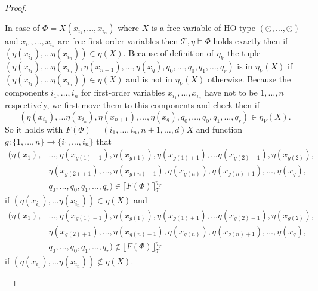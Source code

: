 \begin{proof}
\begin{compactitem}
        \item In case of $\Phi = X(x_{i_1}, \dots, x_{i_n})$ where $X$ is a free variable of HO type $(\odot, \dots,
        \odot)$ and $x_{i_1}, \dots, x_{i_n}$ are free first-order variables then $\mathcal{T}, \eta \models \Phi$
        holds exactly then if $(\eta(x_{i_1}), \dots \eta(x_{i_n})) \in \eta(X)$. Because of definition of $\eta_V$ the
        tuple $(\eta(x_{i_1}), \dots \eta(x_{i_n}), \eta(x_{n + 1}), \dots, \eta(x_{q}), q_0, \dots, q_0, q_1, \dots, q_r)$ is in $
        \eta_V(X)$ if $(\eta(x_{i_1}),\dots \eta(x_{i_n})) \in \eta(X)$ and is not in $\eta_V(X)$ otherwise. Because
        the components $i_1, \dots, i_n$ for first-order variables $x_{i_1}, \dots, x_{i_n}$ have not to be $1,
        \dots, n$ respectively, we first move them to this components and check then if
        \[(\eta(x_{i_1}), \dots \eta(x_{i_n}), \eta(x_{n + 1}), \dots, \eta(x_{q}), q_0, \dots, q_0, q_1, \dots, q_r) \in \eta_V(X).\]
        So it holds with $F(\Phi) = {(i_1, \dots, i_n, n+1, \dots, d)}X$ and function $g: \{1, \dots, n\}
        \rightarrow \{i_1, \dots, i_n\}$ that
        \begin{align*}
            (\eta(x_1),& \dots, \eta(x_{g(1)-1}), \eta(x_{g(1)}), \eta(x_{g(1)+1}), \dots \eta(x_{g(2)-1}), \eta
            (x_{g(2)}),\\& \eta(x_{g(2)+1}), \dots, \eta(x_{g(n)-1}), \eta(x_{g(n)}), \eta(x_{g(n)+1}), \dots, \eta
            (x_q),\\& q_0, \dots, q_0, q_1, \dots, q_r) \in \llbracket F(\Phi) \rrbracket^{\eta_V
            }_\mathcal{T}
        \end{align*}
        if $(\eta(x_{i_1}), \dots \eta(x_{i_n})) \in \eta(X)$ and
        \begin{align*}
            (\eta(x_1),& \dots, \eta(x_{g(1)-1}), \eta(x_{g(1)}), \eta(x_{g(1)+1}), \dots \eta(x_{g(2)-1}), \eta
            (x_{g(2)}),\\& \eta(x_{g(2)+1}), \dots, \eta(x_{g(n)-1}), \eta(x_{g(n)}), \eta(x_{g(n)+1}), \dots, \eta
            (x_q),\\& q_0, \dots, q_0, q_1, \dots, q_r) \not\in \llbracket F(\Phi) \rrbracket^{\eta_V
            }_\mathcal{T}
        \end{align*}
        if $(\eta(x_{i_1}), \dots \eta(x_{i_n})) \not\in \eta(X)$.


\end{compactitem}
\end{proof}
